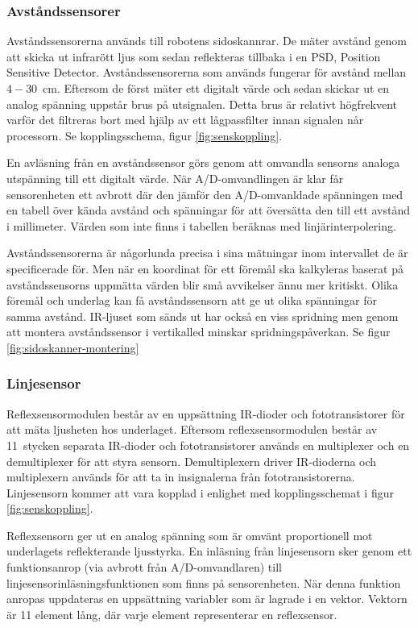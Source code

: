 \subsubsection{Avståndssensorer}
Avståndssensorerna används till robotens sidoskannrar. De mäter avstånd genom att skicka ut infrarött ljus som sedan reflekteras tillbaka i en PSD, Position Sensitive Detector. Avståndssensorerna som används fungerar för avstånd mellan \mbox{$4-30$ cm}. Eftersom de först mäter ett digitalt värde och sedan skickar ut en analog spänning uppstår brus på utsignalen. Detta brus är relativt högfrekvent varför det filtreras bort med hjälp av ett lågpassfilter innan signalen når processorn. Se kopplingsschema, figur \ref{fig:senskoppling}.

En avläsning från en avståndssensor görs genom att omvandla sensorns analoga utspänning till ett digitalt värde. När A/D-omvandlingen är klar får sensorenheten ett avbrott där den jämför den A/D-omvanldade spänningen med en tabell över kända avstånd och spänningar för att översätta den till ett avstånd i millimeter. Värden som inte finns i tabellen beräknas med linjärinterpolering. 

Avståndssensorerna är någorlunda precisa i sina mätningar inom intervallet de är specificerade för. Men när en koordinat för ett föremål ska kalkyleras baserat på avståndssensorns uppmätta värden blir små avvikelser ännu mer kritiskt. Olika föremål och underlag kan få avståndssensorn att ge ut olika spänningar för samma avstånd. IR-ljuset som sänds ut har också en viss spridning men genom att montera avståndssensor i vertikalled minskar spridningspåverkan. Se figur \ref{fig:sidoskanner-montering}

\subsubsection{Linjesensor}
Reflexsensormodulen består av en uppsättning IR-dioder och fototransistorer för att mäta ljusheten hos underlaget. Eftersom reflexsensormodulen består av 11~stycken separata IR-dioder och fototransistorer används en multiplexer och en demultiplexer för att styra sensorn. Demultiplexern driver IR-dioderna och multiplexern används för att ta in insignalerna från fototransistorerna. Linjesensorn kommer att vara kopplad i enlighet med kopplingsschemat i figur \ref{fig:senskoppling}.

Reflexsensorn ger ut en analog spänning som är omvänt proportionell mot underlagets reflekterande ljusstyrka. En inläsning från linjesensorn sker genom ett funktionsanrop (via avbrott från A/D-omvandlaren) till linjesensorinläsningsfunktionen som finns på sensorenheten. När denna funktion anropas uppdateras en uppsättning variabler som är lagrade i en vektor. Vektorn är 11 element lång, där varje element representerar en reflexsensor.

